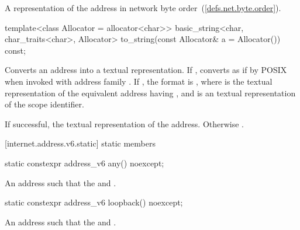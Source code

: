 \begin{itemdescr}
\pnum
\returns A representation of the address in network byte order~(\ref{defs.net.byte.order}).
\end{itemdescr}

%
\begin{itemdecl}
template<class Allocator = allocator<char>>
  basic_string<char, char_traits<char>, Allocator>
    to_string(const Allocator& a = Allocator()) const;
\end{itemdecl}

\begin{itemdescr}
\pnum
\effects Converts an address into a textual representation. If , converts as if by POSIX  when invoked with address family . If , the format is \tcode{\%}, where  is the textual representation of the equivalent address having , and  is an  textual representation of the scope identifier.

\pnum
\returns If successful, the textual representation of the address. Otherwise .
\end{itemdescr}



[internet.address.v6.static]{ static members}

%
\begin{itemdecl}
static constexpr address_v6 any() noexcept;
\end{itemdecl}

\begin{itemdescr}
\pnum
\returns An address  such that the  and .
\end{itemdescr}

%
\begin{itemdecl}
static constexpr address_v6 loopback() noexcept;
\end{itemdecl}

\begin{itemdescr}
\pnum
\returns An address  such that the  and .
\end{itemdescr}



